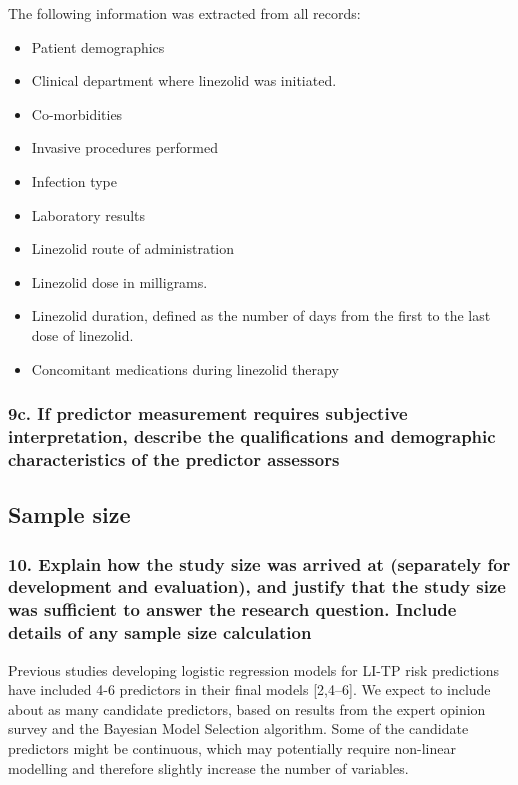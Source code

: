 \documentclass[
  letterpaper,
  DIV=11,
  numbers=noendperiod]{scrartcl}
\providecommand{\tightlist}{%
  \setlength{\itemsep}{0pt}\setlength{\parskip}{0pt}}\usepackage{longtable,booktabs,array}
\begin{document}
The following information was extracted from all records:

\begin{itemize}
\tightlist
\item
  Patient demographics
\item
  Clinical department where linezolid was initiated.
\item
  Co-morbidities
\item
  Invasive procedures performed
\item
  Infection type
\item
  Laboratory results
\item
  Linezolid route of administration
\item
  Linezolid dose in milligrams.
\item
  Linezolid duration, defined as the number of days from the first to
  the last dose of linezolid.
\item
  Concomitant medications during linezolid therapy
\end{itemize}

\subsubsection{9c. If predictor measurement requires subjective
interpretation, describe the qualifications and demographic
characteristics of the predictor
assessors}\label{c.-if-predictor-measurement-requires-subjective-interpretation-describe-the-qualifications-and-demographic-characteristics-of-the-predictor-assessors}

\subsection{Sample size}\label{sample-size}

\subsubsection{10. Explain how the study size was arrived at (separately
for development and evaluation), and justify that the study size was
sufficient to answer the research question. Include details of any
sample size
calculation}\label{explain-how-the-study-size-was-arrived-at-separately-for-development-and-evaluation-and-justify-that-the-study-size-was-sufficient-to-answer-the-research-question.-include-details-of-any-sample-size-calculation}

Previous studies developing logistic regression models for LI-TP risk
predictions have included 4-6 predictors in their final models
{[}2,4--6{]}. We expect to include about as many candidate predictors,
based on results from the expert opinion survey and the Bayesian Model
Selection algorithm. Some of the candidate predictors might be
continuous, which may potentially require non-linear modelling and
therefore slightly increase the number of variables.
\end{document}
